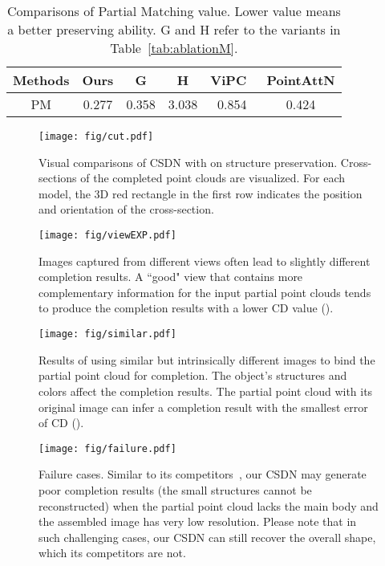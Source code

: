 \begin{table}
\tiny
    \renewcommand\arraystretch{1.2}
        \centering
        \caption{Comparisons of Partial Matching value. Lower value means a better preserving ability. G and H refer to the variants in Table~\ref{tab:ablationM}.}
        \label{tab:ablationPM}
        \small
        \begin{tabular}{c|c|c|c|c|c}
        \hline
        Methods & Ours & G & H  & ViPC~\cite{zhang2021view} & PointAttN \cite{wang2022pointattn}\\
        \hline
        PM  & 0.277 & 0.358 & 3.038 & 0.854 & 0.424 \\
        \hline
        \hline
        \end{tabular}
\end{table}
\begin{figure}[h]
  \centering
  \texttt{[image: fig/cut.pdf]}
  \caption{Visual comparisons of CSDN with \cite{zhang2021view,yu2021pointr} on structure preservation. Cross-sections of the completed point clouds are visualized. For each model, the 3D red rectangle in the first row indicates the position and orientation of the cross-section.}
  \label{fig:cut}
\end{figure} 
\begin{figure*}[h] 
  \centering
  \texttt{[image: fig/viewEXP.pdf]}
  \caption{Images captured from different views often lead to slightly different completion results. A ``good" view that contains more complementary information for the input partial point clouds tends to produce the completion results with a lower CD value ().}
  \label{fig:viewEXP}
\end{figure*}
\begin{figure*}[ht]
  \centering
  \texttt{[image: fig/similar.pdf]}
  \caption{Results of using similar but intrinsically different images to bind the partial point cloud for completion. The object's structures and colors affect the completion results. The partial point cloud with its original image can infer a completion result with the smallest error of CD ().}
  \label{fig:similar}
\end{figure*}
\begin{figure*}[!t] 
  \centering
  \texttt{[image: fig/failure.pdf]}
  \caption{Failure cases. Similar to its competitors~\cite{zhang2021view,yu2021pointr,zhou2022seedformer}, our CSDN may generate poor completion results (the small structures cannot be reconstructed) when the partial point cloud lacks the main body and the assembled image has very low resolution. Please note that in such challenging cases, our CSDN can still recover the overall shape, which its competitors are not.}
  \label{fig:failure}
\end{figure*}
